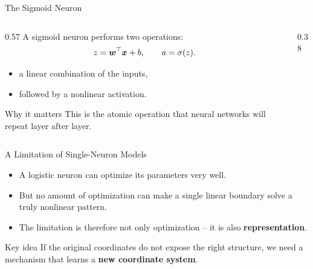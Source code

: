 \documentclass[11pt,aspectratio=169,professionalfonts]{beamer}
\begin{document}
%
%
\begin{frame}{The Sigmoid Neuron}
\begin{columns}[T]
\begin{column}{0.57\textwidth}
A sigmoid neuron performs two operations:
\[
z = \bm{w}^{\top}\bm{x}+b,
\qquad
a = \sigma(z).
\]

\vspace{0.15cm}
\begin{itemize}
    \item a linear combination of the inputs,
    \item followed by a nonlinear activation.
\end{itemize}

\vspace{0.15cm}
\begin{block}{Why it matters}
This is the atomic operation that neural networks will repeat layer after layer.
\end{block}
\end{column}
\begin{column}{0.38\textwidth}
\end{column}
\end{columns}
\end{frame}
%
%
\begin{frame}{A Limitation of Single-Neuron Models}
\begin{itemize}
    \item A logistic neuron can optimize its parameters very well.
    \item But no amount of optimization can make a single linear boundary solve a truly nonlinear pattern.
    \item The limitation is therefore not only optimization -- it is also \textbf{representation}.
\end{itemize}

\vspace{0.2cm}
\begin{alertblock}{Key idea}
If the original coordinates do not expose the right structure, we need a mechanism that learns a \textbf{new coordinate system}.
\end{alertblock}
\end{frame}
\end{document}
